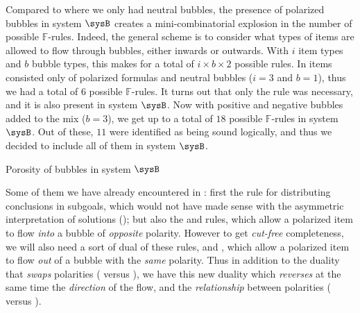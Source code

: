 \begin{description}
  Compared to  where we only had neutral bubbles, the presence of
  polarized bubbles in system $\sysB$ creates a mini-combinatorial explosion in
  the number of possible $\mathbb{F}$-rules. Indeed, the general scheme is to
  consider what types of items are allowed to flow through bubbles, either
  inwards or outwards. With $i$ item types and $b$ bubble types, this makes for
  a total of $i \times b \times 2$ possible rules. In  items consisted
  only of polarized formulas and neutral bubbles ($i = 3$ and $b = 1$), thus we
  had a total of $6$ possible $\mathbb{F}$-rules. It turns out that only the
   rule was necessary, and it is also present in system
  $\sysB$. Now with positive and negative bubbles added to the mix ($b = 3$), we
  get up to a total of $18$ possible $\mathbb{F}$-rules in system $\sysB$. Out
  of these, $11$ were identified as being sound logically, and thus we decided
  to include all of them in system $\sysB$.

  \begin{marginfigure}
    \caption{Porosity of bubbles in system $\sysB$}
  \end{marginfigure}
  
  Some of them we have already encountered in : first the
   rule for distributing conclusions in subgoals, which
  would not have made sense with the asymmetric interpretation of solutions
  (); but also the  and
   rules, which allow a polarized item to flow
  \emph{into} a bubble of \emph{opposite} polarity. However to get
  \emph{cut-free} completeness, we will also need a sort of dual of these rules,
   and , which allow a polarized
  item to flow \emph{out} of a bubble with the \emph{same} polarity. Thus in
  addition to the duality that \emph{swaps} polarities
  ( versus ), we have this new
  duality which \emph{reverses} at the same time the \emph{direction} of the
  flow, and the \emph{relationship} between polarities
  ( versus ).


\end{description}
